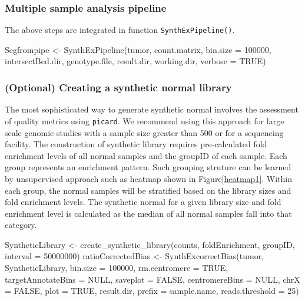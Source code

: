 \documentclass{article}
\newcommand{\code}[1]{\texttt{#1}}
\begin{document}
\subsubsection{Multiple sample analysis pipeline}
The above steps are integrated in function \code{SynthExPipeline()}.
\begin{Schunk}
\begin{Sinput}
 Segfrompipe <- SynthExPipeline(tumor, count.matrix,
      bin.size = 100000, intersectBed.dir, genotype.file,
      result.dir, working.dir, verbose = TRUE)
\end{Sinput}
\end{Schunk}


\subsubsection{(Optional) Creating a synthetic normal library}
The most sophisticated way to generate synthetic normal involves the assessment of quality metrics using \code{picard}. We recommend using this approach for large scale genomic studies with a sample size greater than 500 or for a sequencing facility. The construction of synthetic library requires pre-calculated fold enrichment levels of all normal samples and the groupID of each sample. Each group represents an enrichment pattern. Such grouping struture can be learned by unsupervised approach such as heatmap shown in Figure\ref{heatmap1}. Within each group, the normal samples will be stratified based on the library sizes and fold enrichment levels. The synthetic normal for a given library size and fold enrichment level is calculated as the median of all normal samples fall into that category.

\begin{Schunk}
\begin{Sinput}
 SyntheticLibrary <- create_synthetic_library(counts,
                   foldEnrichment, groupID, interval = 50000000)
 ratioCorrectedBias <- SynthExcorrectBias(tumor,
     SyntheticLibrary, bin.size = 100000, rm.centromere = TRUE,
     targetAnnotateBins = NULL, saveplot = FALSE,
     centromereBins = NULL, chrX = FALSE, plot = TRUE,
     result.dir, prefix = sample.name, reads.threshold = 25)
\end{Sinput}
\end{Schunk}
\end{document}
